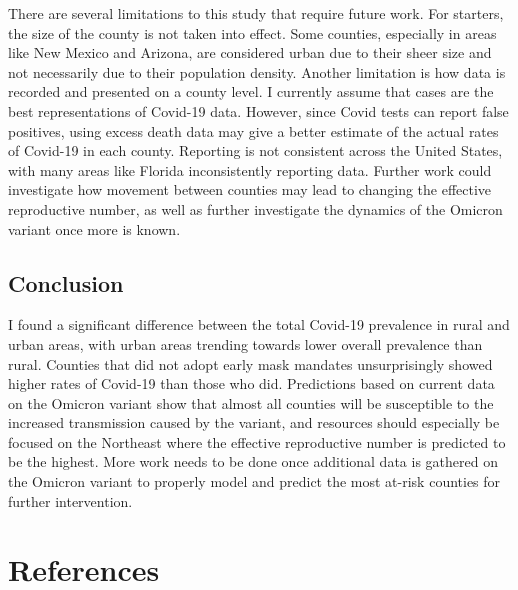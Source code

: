 \documentclass[
  12pt,
]{article}
\begin{document}
There are several limitations to this study that require future work. For starters, the size of the county is not taken into effect. Some counties, especially in areas like New Mexico and Arizona, are considered urban due to their sheer size and not necessarily due to their population density. Another limitation is how data is recorded and presented on a county level. I currently assume that cases are the best representations of Covid-19 data. However, since Covid tests can report false positives, using excess death data may give a better estimate of the actual rates of Covid-19 in each county. Reporting is not consistent across the United States, with many areas like Florida inconsistently reporting data. Further work could investigate how movement between counties may lead to changing the effective reproductive number, as well as further investigate the dynamics of the Omicron variant once more is known.

\hypertarget{conclusion}{%
\subsection{Conclusion}\label{conclusion}}

I found a significant difference between the total Covid-19 prevalence in rural and urban areas, with urban areas trending towards lower overall prevalence than rural. Counties that did not adopt early mask mandates unsurprisingly showed higher rates of Covid-19 than those who did. Predictions based on current data on the Omicron variant show that almost all counties will be susceptible to the increased transmission caused by the variant, and resources should especially be focused on the Northeast where the effective reproductive number is predicted to be the highest. More work needs to be done once additional data is gathered on the Omicron variant to properly model and predict the most at-risk counties for further intervention.

\hypertarget{references}{%
\section{References}\label{references}}
\end{document}
